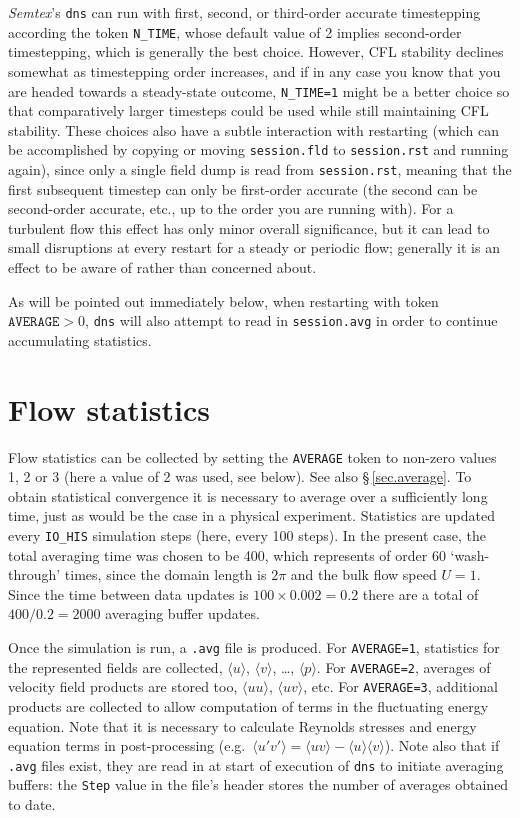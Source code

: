 \documentclass[11pt]{report}
\newcommand{\Semtex}{\emph{Semtex}} \newcommand{\Dog}{\emph{Dog}}
\newcommand{\eg}{e.g.\ } \newcommand{\CC}{\mathrm{c.c.}}
\begin{document}
\Semtex's \verb|dns| can run with first, second, or third-order
accurate timestepping according the token \verb|N_TIME|, whose default
value of 2 implies second-order timestepping, which is generally the
best choice.  However, CFL stability declines somewhat as timestepping
order increases, and if in any case you know that you are headed
towards a steady-state outcome, \verb|N_TIME=1| might be a better
choice so that comparatively larger timesteps could be used while
still maintaining CFL stability.  These choices also have a subtle
interaction with restarting (which can be accomplished by copying or
moving \verb|session.fld| to \verb|session.rst| and running again),
since only a single field dump is read from \verb|session.rst|,
meaning that the first subsequent timestep can only be first-order
accurate (the second can be second-order accurate, etc., up to the
order you are running with).  For a turbulent flow this effect has
only minor overall significance, but it can lead to small disruptions
at every restart for a steady or periodic flow; generally it is an
effect to be aware of rather than concerned about.

As will be pointed out immediately below, when restarting with token
$\texttt{AVERAGE}>0$, \verb|dns| will also attempt to read in
\verb|session.avg| in order to continue accumulating statistics.

\section{Flow statistics}
\label{sec.stats}

Flow statistics can be collected by setting the \verb|AVERAGE| token
to non-zero values 1, 2 or 3 (here a value of 2 was used, see below).
See also \S\,\ref{sec.average}.  To obtain statistical convergence it
is necessary to average over a sufficiently long time, just as would
be the case in a physical experiment. Statistics are updated every
\verb|IO_HIS| simulation steps (here, every 100 steps).  In the
present case, the total averaging time was chosen to be 400, which
represents of order 60 `wash-through' times, since the domain length
is $2\pi$ and the bulk flow speed $U=1$.  Since the time between data
updates is $100\times0.002=0.2$ there are a total of $400/0.2=2000$
averaging buffer updates.

Once the simulation is run, a \texttt{.avg} file is produced. For
\verb|AVERAGE=1|, statistics for the represented fields are collected,
\ie $\langle u\rangle$, $\langle v\rangle$, \ldots, $\langle
p\rangle$.  For \verb|AVERAGE=2|, averages of velocity field products
are stored too, \ie $\langle uu\rangle$, $\langle uv\rangle$, etc.
For \verb|AVERAGE=3|, additional products are collected to allow
computation of terms in the fluctuating energy equation.  Note that it
is necessary to calculate Reynolds stresses and energy equation terms
in post-processing (\eg $\langle u'v'\rangle = \langle
uv\rangle-\langle u\rangle\langle v\rangle$).  Note also that if
\verb|.avg| files exist, they are read in at start of execution of
\verb|dns| to initiate averaging buffers: the \verb|Step| value in the
file's header stores the number of averages obtained to date.
\end{document}
